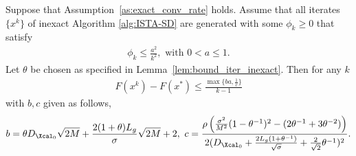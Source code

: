 \documentclass[11pt]{article}
\numberwithin{equation}{section}
\begin{document}
\begin{theorem}\label{th:inexact_conv_rate}
Suppose that Assumption~\ref{as:exact_conv_rate} holds. 
Assume that all iterates $\{x^k\}$ of inexact Algorithm \ref{alg:ISTA-SD} are generated with some $\phi_k\geq 0$ that satisfy
\begin{align}
\label{equ:phi_conv_rate_required}
    \phi_k \leq \frac{a^2}{k^2}, \mbox{ with } 0<a \leq 1. 
\end{align}
Let  $\theta$ be chosen as specified in Lemma~\ref{lem:bound_iter_inexact}. Then for any $k$
\begin{align}
    \label{eq:bound_F_F*}
	F(x^k) - F(x^*) 
    \leq \frac{\max\{ba, \frac{1}{c}\}}{k-1}
\end{align}
with $b, c$  given as follows,
\begin{align}
\label{equ:bound_b_c}
    b = \theta D_{\Xcal_0}\sqrt{2M}+  \frac{2(1+\theta)L_g}{\sigma}\sqrt{2M} + 2, 
    ~
    c = \frac{\rho \left( \frac{\sigma^2}{M^2}(1 - \theta^{-1})^2 - (2\theta^{-1} + 3\theta^{-2}) \right)}{2(D_{\Xcal_0} +
     \frac{2L_g(1+\theta^{-1})}{\sqrt{\sigma}} + \frac{2}{\sqrt{2}}\theta^{-1})^2}.
\end{align}
\end{theorem}
\end{document}
